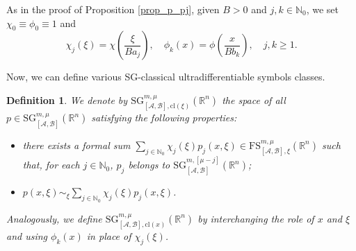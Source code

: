 \documentclass[11pt,reqno]{amsart}
\numberwithin{equation}{section}
\newtheorem{definition}[theorem]{Definition}
\newcommand{\R}{{\mathbb{R}}} %
\newcommand{\N}{{\mathbb{N}}} %
\newcommand{\SG}{{\mathrm{SG}}}
\newcommand{\FS}{{\mathrm{FS}}}
\newcommand{\A}{{\mathcal{A}}} %
\newcommand{\B}{{\mathcal{B}}} %
\begin{document}
As in the proof of Proposition \ref{prop_p_pj}, given $B>0$ and $j,k\in\N_0$, we set $\chi_0\equiv \phi_0\equiv 1$ and
%
\begin{equation*}
	\chi_j(\xi)=\chi\left(\frac{\xi}{Ba_j}\right),\quad \phi_k(x)=\phi\left(\frac{x}{Bb_k}\right), \quad j,k\geq 1.
\end{equation*}

Now, we can define various SG-classical ultradifferentiable symbols classes.

\begin{definition}
	We denote by ${\SG}_{[\A,\B],\mathrm{cl}(\xi)}^{m,\mu}(\R^n)$ the space of all $p\in {\SG}_{[\A,\B]}^{m,\mu}(\R^n)$ satisfying the following properties:
	\begin{itemize}
		\item there exists a formal sum $\sum_{j\in\N_0} \chi_j(\xi)p_j(x,\xi)\in \FS_{[\A,\B],\xi}^{m,\mu}(\R^n)$ such that, for each $j\in\N_0$, 
		$p_j$ belongs to ${\SG}_{[\A,\B]}^{m,[\mu-j]}(\R^n)$;
		\item $p(x,\xi)\sim_\xi \sum_{j\in\N_0}\chi_j(\xi)p_j(x,\xi)$.
	\end{itemize} 
	
	Analogously, we define ${\SG}_{[\A,\B],\mathrm{cl}(x)}^{m,\mu}(\R^n)$ by interchanging the role of $x$ and $\xi$ and using $\phi_k(x)$ in place of $\chi_j(\xi)$.
\end{definition}
\end{document}

